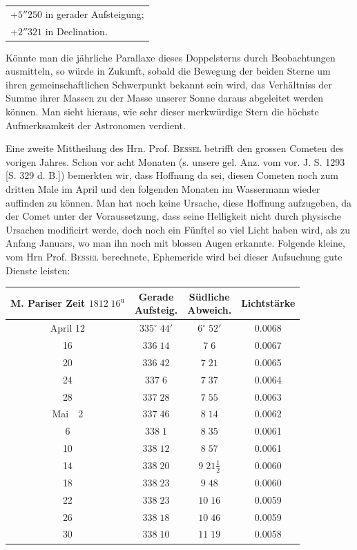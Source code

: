 \begin{center}\fontsize{10}{12}\selectfont\setlength{\tabcolsep}{0pt}\renewcommand{\arraystretch}{1.15}\begin{tabular}{l}
$+5''250$ in gerader Aufsteigung;\\$+2''321$ in Declination.
\end{tabular}\end{center}
\noindent Könnte man die jährliche Parallaxe dieses Doppelsterns durch Beobachtungen ausmitteln, so würde in Zukunft, sobald die Bewegung der beiden Sterne um ihren gemeinschaftlichen Schwerpunkt bekannt sein wird, das Verhältniss der Summe ihrer Massen zu der Masse unserer Sonne daraus abgeleitet werden können. Man sieht hieraus, wie sehr dieser merkwürdige Stern die höchste Aufmerksamkeit der Astronomen verdient.

\par\indent Eine zweite Mittheilung des Hrn. Prof. \textsc{Bessel} betrifft den grossen Cometen des vorigen Jahres. Schon vor acht Monaten (s. unsere gel. Anz. vom vor. J. S. 1293 [S. 329 d. B.]) bemerkten wir, dass Hoffnung da sei, diesen Cometen noch zum dritten Male im April und den folgenden Monaten im Wassermann wieder auffinden zu können. Man hat noch keine Ursache, diese Hoffnung aufzugeben, da der Comet unter der Voraussetzung, dass seine Helligkeit nicht durch physische Ursachen modificirt werde, doch noch ein Fünftel so viel Licht haben wird, als zu Anfang Januars, wo man ihn noch mit blossen Augen erkannte. Folgende kleine, vom Hrn Prof. \textsc{Bessel} berechnete, Ephemeride wird bei dieser Aufsuchung gute Dienste leisten:

\begin{center}
\fontsize{10}{12}\selectfont\setlength{\tabcolsep}{3pt}\renewcommand{\arraystretch}{1.15}\begin{tabular}{c|c|c|c}
\shortstack{M. Pariser Zeit\\$1812\;16^{\mathrm u}$} & \shortstack{Gerade\\Aufsteig.} & \shortstack{Südliche\\Abweich.} & Lichtstärke \\
\hline
April 12 & $335^\circ\;44'$ & $6^\circ\;52'$ & 0.0068 \\
16 & $336\;14$ & $7\;6$ & 0.0067 \\
20 & $336\;42$ & $7\;21$ & 0.0065 \\
24 & $337\;6$ & $7\;37$ & 0.0064 \\
28 & $337\;28$ & $7\;55$ & 0.0063 \\
Mai\ \ 2 & $337\;46$ & $8\;14$ & 0.0062 \\
6 & $338\;1$ & $8\;35$ & 0.0061 \\
10 & $338\;12$ & $8\;57$ & 0.0061 \\
14 & $338\;20$ & $9\;21\tfrac{1}{2}$ & 0.0060 \\
18 & $338\;23$ & $9\;48$ & 0.0060 \\
22 & $338\;23$ & $10\;16$ & 0.0059 \\
26 & $338\;18$ & $10\;46$ & 0.0059 \\
30 & $338\;10$ & $11\;19$ & 0.0058 \\
\end{tabular}
\end{center}
